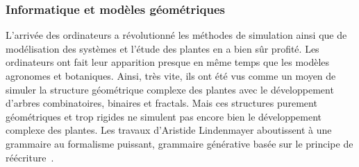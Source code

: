 \subsubsection{Informatique et modèles géométriques}

L’arrivée des ordinateurs a révolutionné les méthodes de simulation ainsi que
de modélisation des systèmes et l’étude des plantes en a bien sûr profité.
Les ordinateurs ont fait leur apparition presque en même temps que les
modèles agronomes et botaniques. Ainsi, très vite, ils ont été vus comme un
moyen de simuler la structure géométrique complexe des plantes avec le
développement d’arbres combinatoires, binaires et fractals. 
Mais ces structures purement géométriques et trop rigides ne simulent pas
encore bien le développement complexe des plantes.
Les travaux d’Aristide Lindenmayer aboutissent à une grammaire au formalisme
puissant, grammaire générative basée sur le principe de
réécriture~\cite{LSystem}.

